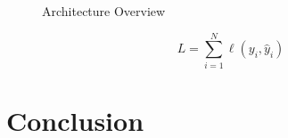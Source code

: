 \documentclass[12pt,a4paper]{article}
\begin{document}
\begin{figure}[h]
\centering
\caption{Architecture Overview}
\label{fig:arch}
\end{figure}

\begin{equation}
\label{eq:loss}
L = \sum_{i=1}^{N} \ell(y_i, \hat{y}_i)
\end{equation}

\section{Conclusion}



\end{document}
